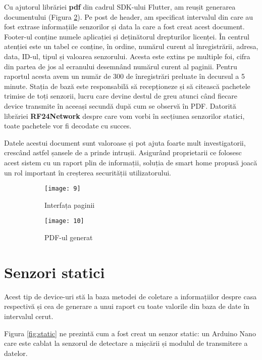 Cu ajutorul librăriei \textbf{pdf} din cadrul SDK-ului Flutter, am reușit generarea documentului (Figura \ref{fig:10}). Pe post de header, am specificat intervalul din care au fost extrase informațiile senzorilor și data la care a fost creat acest document. Footer-ul conține numele aplicației și deținătorul drepturilor licenței. În centrul atenției este un tabel ce conține, în ordine, numărul curent al înregistrării, adresa, data, ID-ul, tipul și valoarea senzorului. Acesta este extins pe multiple foi, cifra din partea de jos al ecranului desemnând numărul curent al paginii. Pentru raportul acesta avem un număr de 300 de înregistrări preluate în decursul a 5 minute. Stația de bază este responsabilă să recepționeze și să citească pachetele trimise de toți senzorii, lucru care devine destul de greu atunci când fiecare device transmite în aceeași secundă după cum se observă în PDF. Datorită librăriei \textbf{RF24Network} despre care vom vorbi în secțiunea senzorilor statici, toate pachetele vor fi decodate cu succes.

Datele acestui document sunt valoroase și pot ajuta foarte mult investigatorii, crescând astfel șansele de a prinde intrușii. Asigurând proprietarii ce folosesc acest sistem cu un raport plin de informații, soluția de smart home propusă joacă un rol important în creșterea securității utilizatorului.

\begin{figure}[h]
	\centering
	\begin{subfigure}{0.43\textwidth}
		\centering
		\texttt{[image: 9]}
		\caption{Interfața paginii}
		\label{fig:9}
	\end{subfigure}
	\hfill
	\begin{subfigure}{0.43\textwidth}
		\centering
		\texttt{[image: 10]}
		\caption{PDF-ul generat}
		\label{fig:10}
	\end{subfigure}
	\caption{}
	\label{fig:all4}
\end{figure}
\break

\section{Senzori statici}

Acest tip de device-uri stă la baza metodei de coletare a informațiilor despre casa respectivă și cea de generare a unui raport cu toate valorile din baza de date în intervalul cerut.

Figura \ref{fig:static} ne prezintă cum a fost creat un senzor static: un Arduino Nano care este cablat la senzorul de detectare a mișcării și modulul de transmitere a datelor. 

